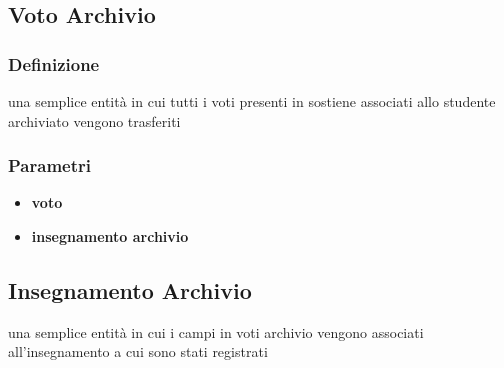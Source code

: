 \subsection{Voto Archivio} \label{voto archivio}
\subsubsection{Definizione}
una semplice entità in cui tutti i voti presenti in sostiene associati allo studente archiviato vengono trasferiti
\subsubsection{Parametri}
\begin{itemize}
    \item \textbf{voto}
    \item \textbf{insegnamento archivio}
\end{itemize}
\subsection{Insegnamento Archivio} \label{insegnamento archivio}
una semplice entità in cui i campi in voti archivio vengono associati all'insegnamento a cui sono stati registrati